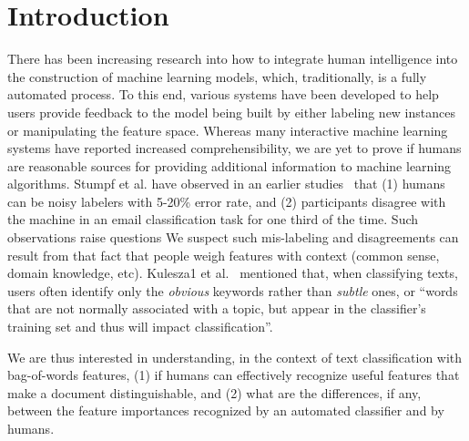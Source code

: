 \section{Introduction}


There has been increasing research into how to integrate human intelligence into the construction of machine learning models, which, traditionally, is a fully automated process.
To this end, various systems have been developed to help users provide feedback to the model being built by either labeling new instances or manipulating the feature space. 
Whereas many interactive machine learning systems have reported increased comprehensibility, we are yet to prove if humans are reasonable sources for providing additional information to machine learning algorithms.
Stumpf et al. have observed in an earlier studies~\cite{stumpf2009interacting} that (1) humans can be noisy labelers with 5-20\% error rate, and (2) participants disagree with the machine in an email classification task for one third of the time.
Such observations raise questions 
We suspect such mis-labeling and disagreements can result from that fact that people weigh features with context (common sense, domain knowledge, etc).
Kulesza1 et al.~\cite{kulesza2015principles} mentioned that, when classifying texts, users often identify only the \emph{obvious} keywords rather than \emph{subtle} ones, or ``words that are not normally associated with a topic, but appear in the classifier's training set and thus will impact classification''.

We are thus interested in understanding, in the context of text classification with bag-of-words features, 
(1) if humans can effectively recognize useful features that make a document distinguishable, and 
(2) what are the differences, if any, between the feature importances recognized by an automated classifier and by humans.
